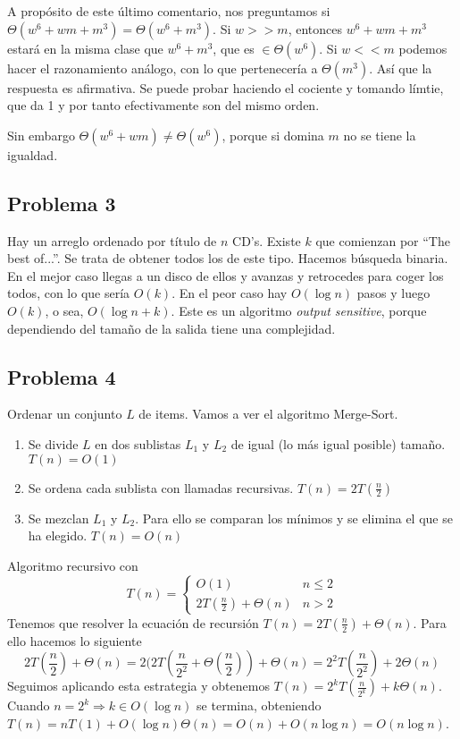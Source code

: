 \documentclass[AL.tex]{subfiles}
\begin{document}
A propósito de este último comentario, nos preguntamos si $\Theta(w^6+wm+m^3)=\Theta(w^6+m^3)$. Si $w>>m$, entonces $w^6+wm+m^3$ estará en la misma clase que $w^6+m^3$, que es $\in\Theta(w^6)$. Si $w<<m$ podemos hacer el razonamiento análogo, con lo que pertenecería a $\Theta(m^3)$. Así que la respuesta es afirmativa. Se puede probar haciendo el cociente y tomando límtie, que da 1 y por tanto efectivamente son del mismo orden. 

Sin embargo $\Theta(w^6+wm)\neq\Theta(w^6)$, porque si domina $m$ no se tiene la igualdad. 

\subsection{Problema 3}
Hay un arreglo ordenado por título de $n$ CD's. Existe $k$ que comienzan por ``The best of...''. Se trata de obtener todos los de este tipo. Hacemos búsqueda binaria. En el mejor caso llegas a un disco de ellos y avanzas y retrocedes para coger los todos, con lo que sería $O(k)$. En el peor caso hay $O(\log n)$ pasos y luego $O(k)$, o sea, $O(\log n +k)$. Este es un algoritmo \emph{output sensitive}, porque dependiendo del tamaño de la salida tiene una complejidad. 


\subsection{Problema 4}
Ordenar un conjunto $L$ de items. Vamos a ver el algoritmo Merge-Sort. 
\begin{enumerate}
\item Se divide $L$ en dos sublistas $L_1$ y $L_2$ de igual (lo más igual posible) tamaño. $T(n)=O(1)$
\item Se ordena cada sublista con llamadas recursivas. $T(n)=2T(\frac{n}{2})$
\item Se mezclan $L_1$ y $L_2$.  Para ello se comparan los mínimos y se elimina el que se ha elegido. $T(n)=O(n)$
\end{enumerate}

Algoritmo recursivo con 
\[
T(n)=\begin{cases}
O(1) & n\leq 2\\
2T(\frac{n}{2})+\Theta(n) & n>2
\end{cases}
\]
Tenemos que resolver la ecuación de recursión $T(n)=2T(\frac{n}{2})+\Theta(n)$. Para ello hacemos lo siguiente
\[
2T(\frac{n}{2})+\Theta(n)=2(2T(\frac{n}{2^2}+\Theta(\frac{n}{2}))+\Theta(n)=2^2T(\frac{n}{2^2})+2\Theta(n)
\]
Seguimos aplicando esta estrategia y obtenemos $T(n)=2^kT(\frac{n}{2^k})+k\Theta(n)$. Cuando $n=2^k\Rightarrow k\in O(\log n)$ se termina, obteniendo $T(n)=nT(1)+O(\log n)\Theta(n)=O(n)+O(n\log n)=O(n\log n)$. 
\end{document}
